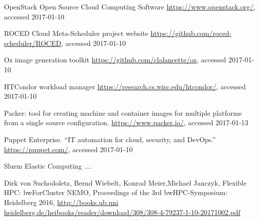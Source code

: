 \begin{thebibliography}{}
%
%
OpenStack Open Source Cloud Computing Software
\url{https://www.openstack.org/}, accessed 2017-01-10

ROCED Cloud Meta-Scheduler project website
\url{https://github.com/roced-scheduler/ROCED}, accessed 2017-01-10

Oz image generation toolkit
\url{https://github.com/clalancette/oz}, accessed 2017-01-10

HTCondor workload manager
\url{https://research.cs.wisc.edu/htcondor/}, accessed 2017-01-10


Packer: tool for creating machine and container images for multiple platforms from a single source configuration. 
\url{https://www.packer.io/}, accessed 2017-01-13


Puppet Enterprise. ``IT automation for cloud, security, and DevOps.''
\url{https://puppet.com/}, accessed 2017-01-10

Slurm Elastic Computing ....


Dirk von Suchodoletz, Bernd Wiebelt, Konrad Meier,Michael Janczyk,
  Flexible HPC: bwForCluster NEMO, 
Proceedings of the 3rd bwHPC-Symposium: Heidelberg 2016, \url{http://books.ub.uni
heidelberg.de/heibooks/reader/download/308/308-4-79237-1-10-20171002.pdf}


\end{thebibliography}



